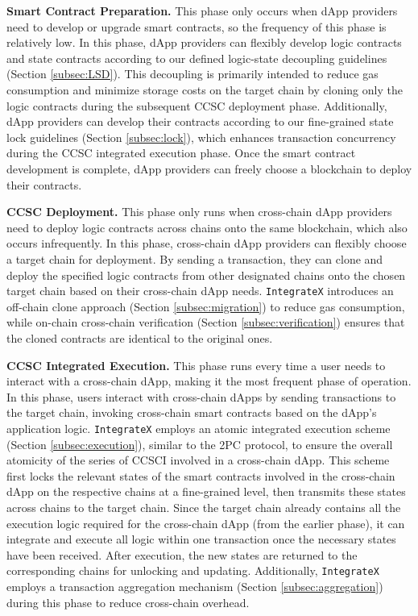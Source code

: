 \vspace{3pt}
\noindent
\textbf{Smart Contract Preparation.} 
This phase only occurs when dApp providers need to develop or upgrade smart contracts, so the frequency of this phase is relatively low. 
In this phase, dApp providers can flexibly develop logic contracts and state contracts according to our defined logic-state decoupling guidelines (Section \ref{subsec:LSD}). 
This decoupling is primarily intended to reduce gas consumption and minimize storage costs on the target chain by cloning only the logic contracts during the subsequent CCSC deployment phase. 
Additionally, dApp providers can develop their contracts according to our fine-grained state lock guidelines (Section \ref{subsec:lock}), which enhances transaction concurrency during the CCSC integrated execution phase. 
Once the smart contract development is complete, dApp providers can freely choose a blockchain to deploy their contracts. 

\vspace{3pt}
\noindent
\textbf{CCSC Deployment.} 
This phase only runs when cross-chain dApp providers need to deploy logic contracts across chains onto the same blockchain, which also occurs infrequently. 
In this phase, cross-chain dApp providers can flexibly choose a target chain for deployment. 
By sending a transaction, they can clone and deploy the specified logic contracts from other designated chains onto the chosen target chain based on their cross-chain dApp needs. 
\texttt{IntegrateX} introduces an off-chain clone approach (Section \ref{subsec:migration}) to reduce gas consumption, while on-chain cross-chain verification (Section \ref{subsec:verification}) ensures that the cloned contracts are identical to the original ones.

\vspace{3pt}
\noindent
\textbf{CCSC Integrated Execution.}
This phase runs every time a user needs to interact with a cross-chain dApp, making it the most frequent phase of operation.
In this phase, users interact with cross-chain dApps by sending transactions to the target chain, invoking cross-chain smart contracts based on the dApp’s application logic. 
\texttt{IntegrateX} employs an atomic integrated execution scheme (Section \ref{subsec:execution}), similar to the 2PC protocol, to ensure the overall atomicity of the series of CCSCI involved in a cross-chain dApp.
This scheme first locks the relevant states of the smart contracts involved in the cross-chain dApp on the respective chains at a fine-grained level, 
then transmits these states across chains to the target chain. 
Since the target chain already contains all the execution logic required for the cross-chain dApp (from the earlier phase), it can integrate and execute all logic within one transaction once the necessary states have been received. 
After execution, the new states are returned to the corresponding chains for unlocking and updating.
Additionally, \texttt{IntegrateX} employs a transaction aggregation mechanism (Section \ref{subsec:aggregation}) during this phase to reduce cross-chain overhead.

